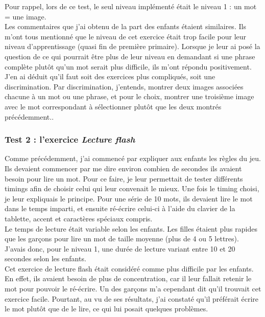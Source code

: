 Pour rappel, lors de ce test, le seul niveau implémenté était le niveau 1 : un mot = une image.\\

Les commentaires que j'ai obtenu de la part des enfants étaient similaires. Ils m'ont tous mentionné que le niveau de cet exercice était trop facile pour leur niveau d'apprentissage (quasi fin de première primaire). Lorsque je leur ai posé la question de ce qui pourrait être plus de leur niveau en demandant si une phrase complète plutôt qu'un mot serait plus difficile, ils m'ont répondu positivement. J'en ai déduit qu'il faut soit des exercices plus compliqués, soit une discrimination. Par discrimination, j'entends, montrer deux images associées chacune à un mot ou une phrase, et pour le choix, montrer une troisième image avec le mot correspondant à sélectionner plutôt que les deux montrés précédemment..

\subsubsection{Test 2 : l'exercice \textit{Lecture flash} \label{testFlash}}
Comme précédemment, j'ai commencé par expliquer aux enfants les règles du jeu.
Ils devaient commencer par me dire environ combien de secondes ils avaient besoin pour lire un mot. Pour ce faire, je leur permettait de tester différents timings afin de choisir celui qui leur convenait le mieux. Une fois le timing choisi, je leur expliquais le principe. Pour une série de 10 mots, ils devaient lire le mot dans le temps imparti, et ensuite ré-écrire celui-ci à l'aide du clavier de la tablette, accent et caractères spéciaux compris.\\

Le temps de lecture était variable selon les enfants. Les filles étaient plus rapides que les garçons pour lire un mot de taille moyenne (plus de 4 ou 5 lettres). J'avais donc, pour le niveau 1, une durée de lecture variant entre 10 et 20 secondes selon les enfants.\\

Cet exercice de lecture flash était considéré comme plus difficile par les enfants. En effet, ils avaient besoin de plus de concentration, car il leur fallait retenir le mot pour pouvoir le ré-écrire. Un des garçons m'a cependant dit qu'il trouvait cet exercice facile. Pourtant, au vu de ses résultats, j'ai constaté qu'il préférait écrire le mot plutôt que de le lire, ce qui lui posait quelques problèmes.\\

